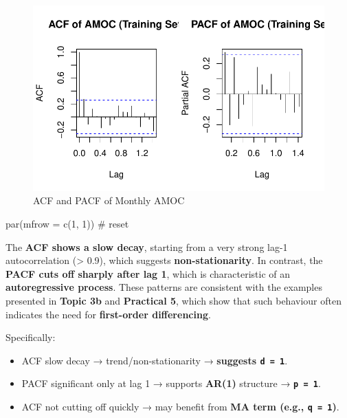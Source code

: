 \documentclass[
  11pt,
]{article}
\newenvironment{Shaded}{\begin{snugshade}}{\end{snugshade}}
\newcommand{\AttributeTok}[1]{\textcolor[rgb]{0.40,0.45,0.13}{#1}}
\newcommand{\CommentTok}[1]{\textcolor[rgb]{0.37,0.37,0.37}{#1}}
\newcommand{\DecValTok}[1]{\textcolor[rgb]{0.68,0.00,0.00}{#1}}
\newcommand{\FunctionTok}[1]{\textcolor[rgb]{0.28,0.35,0.67}{#1}}
\newcommand{\NormalTok}[1]{\textcolor[rgb]{0.00,0.23,0.31}{#1}}
\begin{document}
\begin{figure}[H]

{\centering \includegraphics{project_files/figure-pdf/fig-AMF+PACF-1.pdf}

}

\caption{ACF and PACF of Monthly AMOC}

\end{figure}%

\begin{Shaded}
\begin{Highlighting}[]
\FunctionTok{par}\NormalTok{(}\AttributeTok{mfrow =} \FunctionTok{c}\NormalTok{(}\DecValTok{1}\NormalTok{, }\DecValTok{1}\NormalTok{))  }\CommentTok{\# reset}
\end{Highlighting}
\end{Shaded}

The \textbf{ACF shows a slow decay}, starting from a very strong lag-1
autocorrelation (\textgreater{} 0.9), which suggests
\textbf{non-stationarity}. In contrast, the \textbf{PACF cuts off
sharply after lag 1}, which is characteristic of an
\textbf{autoregressive process}. These patterns are consistent with the
examples presented in \textbf{Topic 3b} and \textbf{Practical 5}, which
show that such behaviour often indicates the need for
\textbf{first-order differencing}.

Specifically:

\begin{itemize}
\item
  ACF slow decay → trend/non-stationarity → \textbf{suggests
  \texttt{d\ =\ 1}}.
\item
  PACF significant only at lag 1 → supports \textbf{AR(1)} structure →
  \textbf{\texttt{p\ =\ 1}}.
\item
  ACF not cutting off quickly → may benefit from \textbf{MA term (e.g.,
  \texttt{q\ =\ 1})}.
\end{itemize}
\end{document}
